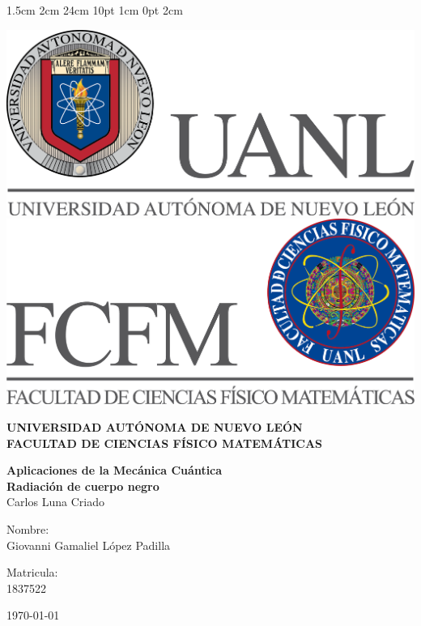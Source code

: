 \documentclass[12pt,letterpaper]{article}
\begin{document}
\setmargins{2.5cm}      
{1.5cm}                     
{2cm}  
{24cm}                    
{10pt}                          
{1cm}                          
{0pt}                             
{2cm}
\begin{titlepage}
\begin{center}
\includegraphics[scale=0.40]{../../../Logos/uanl.png} 
\hspace{2.5cm}
\includegraphics[scale=0.40]{../../../Logos/fcfm.png}
\end{center}
\vspace{2cm}
\begin{center}
\textbf{
UNIVERSIDAD AUTÓNOMA DE NUEVO LEÓN\\
FACULTAD DE CIENCIAS
FÍSICO MATEMÁTICAS}\\
\vspace*{2cm}
\begin{large}
\vspace{1cm}
\large{\textbf{Aplicaciones de la Mecánica Cuántica}}\\
\textbf{Radiación de cuerpo negro}\\
Carlos Luna Criado\\
\end{large}
\vspace{3.5cm}
\begin{minipage}{0.6\linewidth}
\vspace{0.5cm}
\changefontsizes{14pt}
Nombre:\\
Giovanni Gamaliel López Padilla\\
\end{minipage}
\begin{minipage}{0.2\linewidth}
\changefontsizes{14pt}
Matricula:\\
1837522
\end{minipage}
\end{center}
\vspace{4cm}
\begin{flushright}
\today
\end{flushright}
\end{titlepage}
\end{document}
